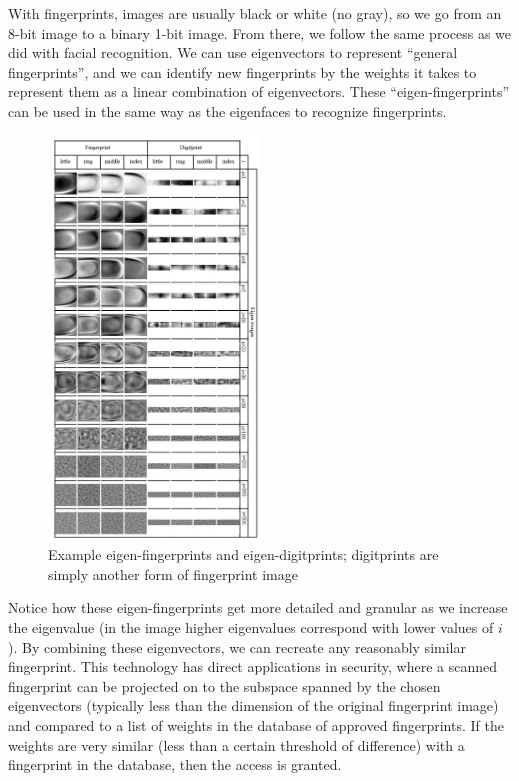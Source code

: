 \documentclass[12pt]{report}
\begin{document}
            With fingerprints, images are usually black or white (no gray), so we go from an 8-bit image to a binary 1-bit image. From there, we follow the same process as we did with facial recognition. We can use eigenvectors to represent ``general fingerprints'', and we can identify new fingerprints by the weights it takes to represent them as a linear combination of eigenvectors. These ``eigen-fingerprints'' can be used in the same way as the eigenfaces to recognize fingerprints.

            \begin{figure}[H]
                \centering
                \includegraphics[width=0.5\textwidth]{eigenfingerprints.png}
                \caption{Example eigen-fingerprints and eigen-digitprints; digitprints are simply another form of fingerprint image \cite{Pavesic2022}}
            \end{figure}

            Notice how these eigen-fingerprints get more detailed and granular as we increase the eigenvalue (in the image higher eigenvalues correspond with lower values of $i$). By combining these eigenvectors, we can recreate any reasonably similar fingerprint. This technology has direct applications in security, where a scanned fingerprint can be projected on to the subspace spanned by the chosen eigenvectors (typically less than the dimension of the original fingerprint image) and compared to a list of weights in the database of approved fingerprints. If the weights are very similar (less than a certain threshold of difference) with a fingerprint in the database, then the access is granted.
\end{document}

